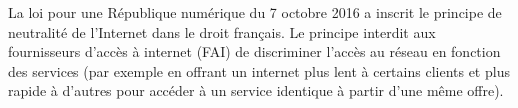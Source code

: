 \documentclass[11pt]{article}
\begin{document}



La loi pour une République numérique du 7 octobre 2016 a inscrit le principe de neutralité de l'Internet dans le droit français. Le principe interdit aux fournisseurs d'accès à internet (FAI) de discriminer l'accès au réseau en fonction des services (par exemple en offrant un internet plus lent à certains clients et plus rapide à d'autres pour accéder à un service identique à partir d'une même offre).


\end{document}
